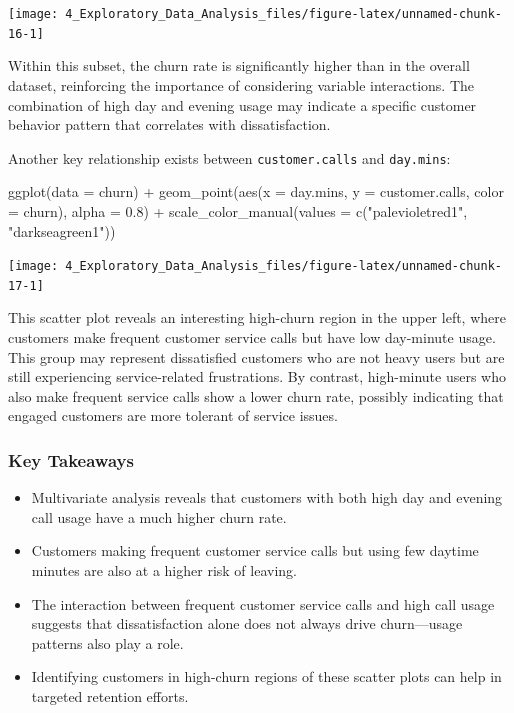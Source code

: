 \documentclass[
  11pt,
]{book}
\makeatletter
\newenvironment{Shaded}{}{}
\newcommand{\AttributeTok}[1]{#1}
\newcommand{\FloatTok}[1]{#1}
\newcommand{\FunctionTok}[1]{#1}
\newcommand{\NormalTok}[1]{#1}
\newcommand{\SpecialCharTok}[1]{\textcolor[rgb]{0.39,0.39,0.39}{#1}}
\newcommand{\StringTok}[1]{\textcolor[rgb]{0.39,0.39,0.39}{#1}}
\providecommand{\tightlist}{%
  \setlength{\itemsep}{0pt}\setlength{\parskip}{0pt}}
\newenvironment{kframe}{%
\medskip{}
\setlength{\fboxsep}{.8em}
 \def\at@end@of@kframe{}%
 \ifinner\ifhmode%
  \def\at@end@of@kframe{\end{minipage}}%
  \begin{minipage}{\columnwidth}%
 \fi\fi%
 \def\FrameCommand##1{\hskip\@totalleftmargin \hskip-\fboxsep
 \colorbox{shadecolor}{##1}\hskip-\fboxsep
     \hskip-\linewidth \hskip-\@totalleftmargin \hskip\columnwidth}%
 \MakeFramed {\advance\hsize-\width
   \@totalleftmargin\z@ \linewidth\hsize
   \@setminipage}}%
 {\par\unskip\endMakeFramed%
 \at@end@of@kframe}
\renewenvironment{Shaded}{\begin{kframe}}{\end{kframe}}
\theoremstyle{definition}
\theoremstyle{definition}
\theoremstyle{definition}
\theoremstyle{definition}
\theoremstyle{remark}
\makeatother
\begin{document}
\begin{center}\texttt{[image: 4\_Exploratory\_Data\_Analysis\_files/figure-latex/unnamed-chunk-16-1]} \end{center}

Within this subset, the churn rate is significantly higher than in the overall dataset, reinforcing the importance of considering variable interactions. The combination of high day and evening usage may indicate a specific customer behavior pattern that correlates with dissatisfaction.

Another key relationship exists between \texttt{customer.calls} and \texttt{day.mins}:

\begin{Shaded}
\begin{Highlighting}[]
\FunctionTok{ggplot}\NormalTok{(}\AttributeTok{data =}\NormalTok{ churn) }\SpecialCharTok{+}
  \FunctionTok{geom\_point}\NormalTok{(}\FunctionTok{aes}\NormalTok{(}\AttributeTok{x =}\NormalTok{ day.mins, }\AttributeTok{y =}\NormalTok{ customer.calls, }\AttributeTok{color =}\NormalTok{ churn), }\AttributeTok{alpha =} \FloatTok{0.8}\NormalTok{) }\SpecialCharTok{+}
  \FunctionTok{scale\_color\_manual}\NormalTok{(}\AttributeTok{values =} \FunctionTok{c}\NormalTok{(}\StringTok{"palevioletred1"}\NormalTok{, }\StringTok{"darkseagreen1"}\NormalTok{))}
\end{Highlighting}
\end{Shaded}

\begin{center}\texttt{[image: 4\_Exploratory\_Data\_Analysis\_files/figure-latex/unnamed-chunk-17-1]} \end{center}

This scatter plot reveals an interesting high-churn region in the upper left, where customers make frequent customer service calls but have low day-minute usage. This group may represent dissatisfied customers who are not heavy users but are still experiencing service-related frustrations. By contrast, high-minute users who also make frequent service calls show a lower churn rate, possibly indicating that engaged customers are more tolerant of service issues.

\subsubsection*{Key Takeaways}\label{key-takeaways}


\begin{itemize}
\tightlist
\item
  Multivariate analysis reveals that customers with both high day and evening call usage have a much higher churn rate.
\item
  Customers making frequent customer service calls but using few daytime minutes are also at a higher risk of leaving.
\item
  The interaction between frequent customer service calls and high call usage suggests that dissatisfaction alone does not always drive churn---usage patterns also play a role.
\item
  Identifying customers in high-churn regions of these scatter plots can help in targeted retention efforts.
\end{itemize}
\end{document}
